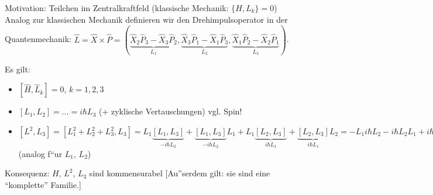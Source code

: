 Motivation: Teilchen im Zentralkraftfeld (klassische Mechanik: $\{H,L_k\}=0$)\\
Analog zur klassischen Mechanik definieren wir den Drehimpulsoperator in der Quantenmechanik: 
$\hat L = \hat X \times \hat P = (\underbrace{\hat X_2 \hat P_3 - \hat X_3 \hat P_2}_{L_1}, 
\underbrace{\hat X_3\hat P_1 - \hat X_1 \hat P_3}_{L_2}, \underbrace{\hat X_1 \hat P_2 - \hat X_2 \hat P_1}_{L_3})$.

Es gilt:
\begin{itemize}
 \item $[\hat H, \hat L_k]=0$, $k=1,2,3$
 \item $[L_1,L_2]=\dots=i\hbar L_3$ (+ zyklische Vertauschungen) \hspace{1cm} vgl. Spin!
 \item $[L^2,L_3]=[L_1^2+L_2^2+L_3^2,L_3] = L_1\underbrace{[L_1,L_3]}_{-i\hbar L_2} + \underbrace{[L_1,L_3]}_{-i\hbar L_2}L_1 + L_1\underbrace{[L_2,L_3]}_{i\hbar L_1} 
 + \underbrace{[L_2,L_3]}_{i\hbar L_1}L_2 = -L_1i\hbar L_2 -i\hbar L_2 L_1 + i\hbar L_2 L_1 + i \hbar L_1 L_2 =0$ (analog f``ur $L_1$, $L_2$) 
\end{itemize}
Konsequenz: $H$, $L^2$, $L_3$ sind kommensurabel [Au''serdem gilt: sie sind eine ``komplette'' Familie.]

